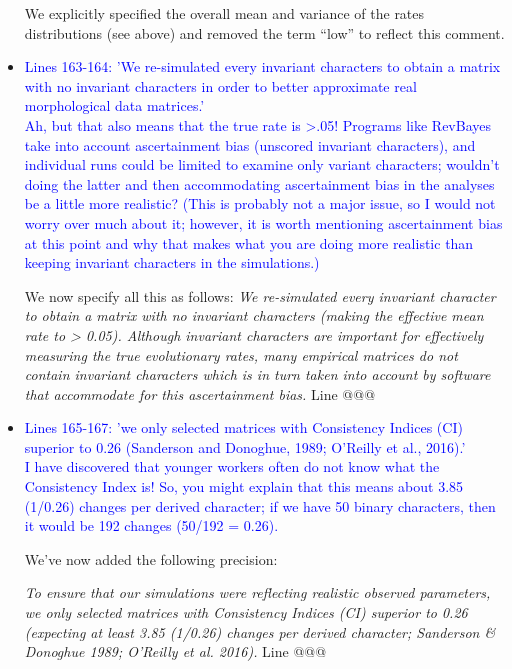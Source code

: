 \documentclass[12pt,letterpaper]{article}
\begin{document}
\begin{itemize}
We explicitly specified the overall mean and variance of the rates distributions (see above) and removed the term ``low'' to reflect this comment.



\item{\textcolor{blue}{Lines 163-164: 'We re-simulated every invariant characters to obtain a matrix with no invariant characters in order to better approximate real morphological data matrices.'
\\
Ah, but that also means that the true rate is >.05! Programs like RevBayes take into account ascertainment bias (unscored invariant characters), and individual runs could be limited to examine only variant characters; wouldn't doing the latter and then accommodating ascertainment bias in the analyses be a little more realistic? (This is probably not a major issue, so I would not worry over much about it; however, it is worth mentioning ascertainment bias at this point and why that makes what you are doing more realistic than keeping invariant characters in the simulations.)}}

We now specify all this as follows:
\textit{We re-simulated every invariant character to obtain a matrix with no invariant characters (making the effective mean rate to > 0.05). Although invariant characters are important for effectively measuring the true evolutionary rates, many empirical matrices do not contain invariant characters which is in turn taken into account by software that accommodate for this ascertainment bias.} Line @@@



\item{\textcolor{blue}{Lines 165-167: 'we only selected matrices with Consistency Indices (CI) superior to 0.26 (Sanderson and Donoghue, 1989; O'Reilly et al., 2016).'
\\
I have discovered that younger workers often do not know what the Consistency Index is! So, you might explain that this means about 3.85 (1/0.26) changes per derived character; if we have 50 binary characters, then it would be 192 changes (50/192 = 0.26).}}

We've now added the following precision:

\textit{To ensure that our simulations were reflecting realistic observed parameters, we only selected matrices with Consistency Indices (CI) superior to 0.26 (expecting at least 3.85 (1/0.26) changes per derived character; Sanderson \& Donoghue 1989; O'Reilly et al. 2016).} Line @@@




\end{itemize}
\end{document}
